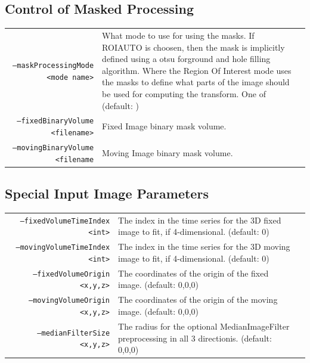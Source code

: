 \documentclass{InsightArticle}
\begin{document}
\subsection{Control of Masked Processing}
\begin{tabular}{rp{0.15in}l}
\vspace{0.15in}\par
\texttt{--maskProcessingMode <mode name>} & \parbox[t]{3.0in}{What mode to use for using the masks.  If ROIAUTO is choosen, then the mask is implicitly defined using a otsu forground and hole filling algorithm. Where the Region Of Interest mode uses the masks to define what parts of the image should be used for computing the transform.  One of   (default: )} \\
\vspace{0.15in}\par
\texttt{--fixedBinaryVolume <filename>} & \parbox[t]{3.0in}{Fixed Image binary mask volume.} \\
\vspace{0.15in}\par
\texttt{--movingBinaryVolume <filename} & \parbox[t]{3.0in}{Moving Image binary mask volume.} \\
\end{tabular}
\subsection{Special Input Image Parameters}
\begin{tabular}{rp{0.15in}l}
\vspace{0.15in}\par
\texttt{--fixedVolumeTimeIndex <int>} & \parbox[t]{3.5in}{The index in the time series for the 3D fixed image to fit, if 4-dimensional. (default: 0)} \\
\vspace{0.15in}\par
\texttt{--movingVolumeTimeIndex <int>} & \parbox[t]{3.5in}{The index in the time series for the 3D moving image to fit, if 4-dimensional. (default: 0)} \\
\vspace{0.15in}\par
\texttt{--fixedVolumeOrigin <x,y,z>} & \parbox[t]{3.5in}{The coordinates of the origin of the fixed image.  (default: 0,0,0)} \\
\vspace{0.15in}\par
\texttt{--movingVolumeOrigin <x,y,z>} & \parbox[t]{3.5in}{The coordinates of the origin of the moving image.  (default: 0,0,0)} \\
\vspace{0.15in}\par
\texttt{--medianFilterSize <x,y,z>} & \parbox[t]{3.5in}{The radius for the optional MedianImageFilter preprocessing in all 3 directionis. (default: 0,0,0)} \\
\end{tabular}
\end{document}
